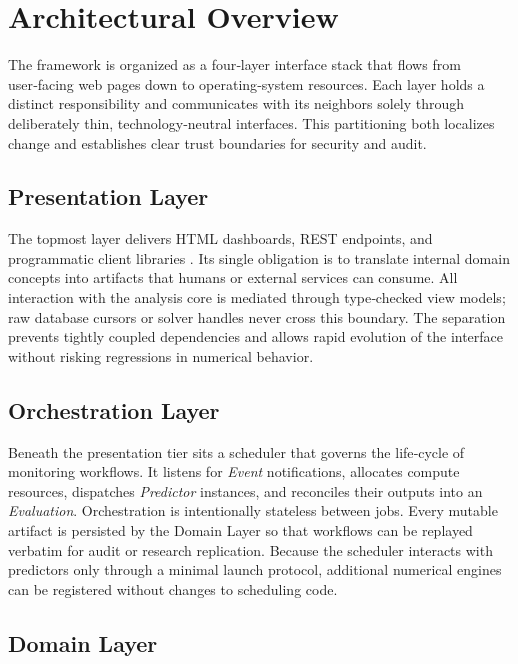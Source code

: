 
\section{Architectural Overview}\label{sec:irie-arch}

The framework is organized as a four‑layer interface stack that
flows from user‑facing web pages down to operating‑system resources. 
Each layer holds a distinct responsibility and
communicates with its neighbors solely through deliberately thin,
technology‑neutral interfaces. 
This partitioning both localizes change %
and establishes clear trust boundaries for security and audit.

\subsection{Presentation Layer}\label{presentation-layer}

The topmost layer delivers HTML dashboards, REST endpoints, and
programmatic client libraries \citep{richardson2015restful}. 
Its single obligation is to translate internal domain concepts into artifacts that humans or external services can consume. 
All interaction with the analysis core is mediated through
type‑checked view models; raw database cursors or solver handles never cross this boundary. 
The separation prevents tightly coupled
dependencies and allows rapid evolution of the interface without risking regressions in numerical behavior.

\subsection{Orchestration Layer}\label{orchestration-layer}

Beneath the presentation tier sits a scheduler that governs the
life‑cycle of monitoring workflows. 
It listens for \emph{Event} notifications, allocates compute resources, dispatches \emph{Predictor}
instances, and reconciles their outputs into an \emph{Evaluation}.
Orchestration is intentionally stateless between jobs. 
Every mutable artifact is persisted by the Domain Layer so that workflows can be replayed verbatim
for audit or research replication. 
Because the scheduler interacts with
predictors only through a minimal launch protocol, additional numerical
engines can be registered without changes to scheduling code.

\subsection{Domain Layer}\label{domain-layer}

